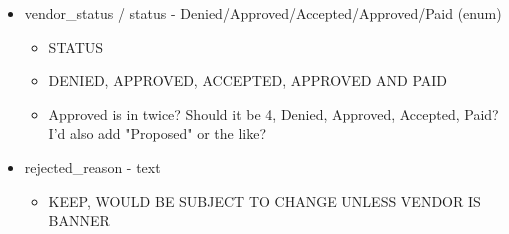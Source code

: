 \documentclass[captions=tablesignature]{scrartcl}
\begin{document}
\begin{itemize}
\item vendor\_status / status - Denied/Approved/Accepted/Approved/Paid (enum)
\label{sec-2-2-20}
\begin{itemize}
\item STATUS
\item DENIED, APPROVED, ACCEPTED, APPROVED AND PAID
\item Approved is in twice?  Should it be 4, Denied, Approved,
Accepted, Paid?  I'd also add "Proposed" or the like?
\end{itemize}

\item rejected\_reason - text
\label{sec-2-2-21}
\begin{itemize}
\item KEEP, WOULD BE SUBJECT TO CHANGE UNLESS VENDOR IS BANNER
\end{itemize}
\end{itemize}
\end{document}
